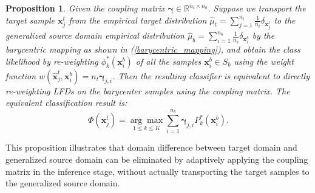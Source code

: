 \documentclass[journal]{IEEEtran}
\newtheorem{proposition}{Proposition}
\begin{document}
\begin{proposition}%
\label{proposition: equivalent}
Given the coupling matrix $\boldsymbol{\gamma}\in\mathbb{R}^{n_t \times n_b}$. Suppose we transport the target sample $\boldsymbol{x}_j^{t}$ from the empirical target distribution $\widehat{\mu}_{t}=\sum_{j=1}^{n_t}\frac{1}{n_t} \delta_{\boldsymbol{x}_j^{t}}$ to the generalized source domain empirical distribution $\widehat{\mu}_{b}=\sum_{i=1}^{n_{b}}\frac{1}{n_{b}} \delta_{\boldsymbol{x}_i^{b}}$ 
by the barycentric mapping as shown in (\ref{barycentric_mapping}), and obtain the class likelihood by re-weighting $\phi^*_k(\boldsymbol{x}_i^b)$ of all the samples $\boldsymbol{x}_i^b \in S_b$ using the weight function $w\left(\widehat{\boldsymbol{x}}_j^{t},\boldsymbol{x}_i^{b}\right)=n_t \boldsymbol{\gamma}_{j,i}$.
Then the resulting classifier is equivalent to directly re-weighting LFDs on the barycenter samples using the coupling matrix. The equivalent classification result is:
\begin{equation}
    \Phi(\boldsymbol{x}^t_j)=\underset{1 \leq k \leq K}{\arg \max }\sum_{i=1}^{n_b}{\boldsymbol{\gamma}_{j,i}} P^*_k(\boldsymbol{x}^{b}_{i}).
\end{equation}
\end{proposition}
This proposition illustrates that domain difference between target domain and generalized source domain can be eliminated by adaptively  applying the coupling matrix in the inference stage, without actually transporting the target samples to the generalized source domain.

\end{document}
